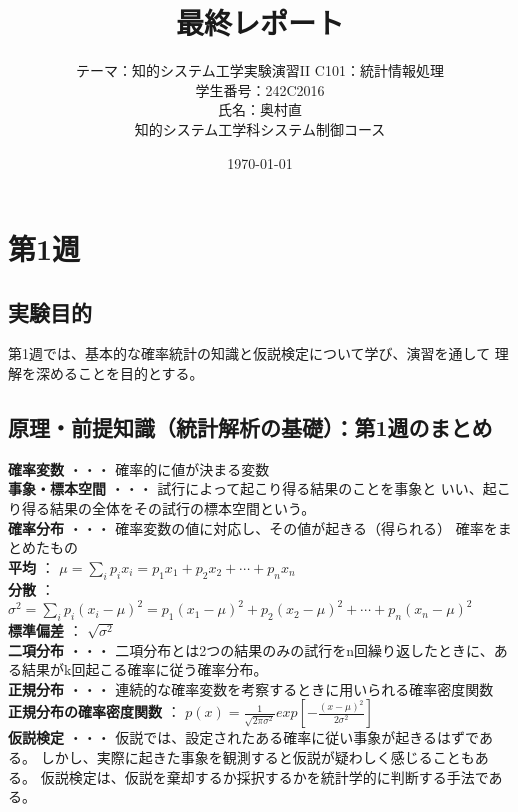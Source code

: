 \documentclass[10pt,a4paper,titlepage]{jreport} %
\title{最終レポート} %
\author{
  テーマ：知的システム工学実験演習II C101：統計情報処理 \\
学生番号：242C2016 \\
  氏名：奥村直 \\
  知的システム工学科システム制御コース
} %
\date{\today} %
\begin{document}
\maketitle

\chapter{第1週}

\section{実験目的}

第1週では、基本的な確率統計の知識と仮説検定について学び、演習を通して
理解を深めることを目的とする。

\section{原理・前提知識（統計解析の基礎）：第1週のまとめ}

\textbf{確率変数} ・・・ 確率的に値が決まる変数 \\
\textbf{事象・標本空間} ・・・ 試行によって起こり得る結果のことを事象と
いい、起こり得る結果の全体をその試行の標本空間という。\\
\textbf{確率分布} ・・・ 確率変数の値に対応し、その値が起きる（得られる）
確率をまとめたもの \\

\textbf{平均} ： $\mu = \sum_{i}^{} p_{i}x_{i} = p_{1}x_{1} + p_{2}x_{2} + \cdots + p_{n}x_{n}$ \\
\textbf{分散} ： $\sigma^2 = \sum_{i}^{} p_{i}(x_{i} - \mu)^2 = p_{1}(x_{1} - \mu)^2 + p_{2}(x_{2} - \mu)^2 + \cdots + p_{n}(x_{n} - \mu)^2$ \\
\textbf{標準偏差} ： $\sqrt{\sigma^2}$\\

\textbf{二項分布} ・・・ 二項分布とは2つの結果のみの試行をn回繰り返したときに、ある結果がk回起こる確率に従う確率分布。\\
\textbf{正規分布} ・・・ 連続的な確率変数を考察するときに用いられる確率密度関数\\

\textbf{正規分布の確率密度関数} ： $p(x) = \frac{1}{\sqrt{2\pi\sigma^2}} exp\left[-\frac{(x-\mu)^2}{2\sigma^2}\right] $\\

\textbf{仮説検定} ・・・ 仮説では、設定されたある確率に従い事象が起きるはずである。
しかし、実際に起きた事象を観測すると仮説が疑わしく感じることもある。
仮説検定は、仮説を棄却するか採択するかを統計学的に判断する手法である。
\end{document}

